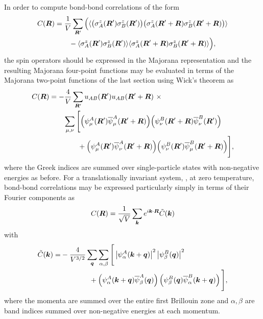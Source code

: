 In order to compute bond-bond correlations of the form
%
\begin{align}
	C(\bm{R}) 	&= \frac{1}{V} \sum_{\bm{R}'} \Big( \langle \big(\sigma^z_A(\bm{R}') \sigma^z_B(\bm{R}')\big) \big(\sigma^z_A(\bm{R}'+\bm{R}) \sigma^z_B(\bm{R}'+\bm{R})\big) \rangle\nonumber\\
			&\qquad- \langle \sigma^z_A(\bm{R}') \sigma^z_B(\bm{R}') \rangle \langle \sigma^z_A(\bm{R}'+\bm{R}) \sigma^z_B(\bm{R}'+\bm{R}) \rangle \Big),
\end{align}
%
the spin operators should be expressed in the Majorana representation and the resulting Majorana four-point functions may be evaluated in terms of the Majorana two-point functions of the last section using Wick's theorem as
%
\begin{align}
	C(\bm{R}) 	&= -\frac{4}{V} \sum_{\bm{R}'} u_{AB}(\bm{R}') u_{AB}(\bm{R}' + \bm{R})~\times \nonumber\\
			&\qquad\sum_{\mu,\nu} \Bigg[\Big(\psi_{\mu}^A(\bm{R}') \overline{\psi}_{\mu}^A(\bm{R}' + \bm{R})\Big) \Big(\psi_{\nu}^B(\bm{R}' + \bm{R}) \overline{\psi}_{\nu}^B(\bm{R}') \Big) \nonumber\\
			&\qquad\qquad+ \Big(\psi_{\mu}^A(\bm{R}') \overline{\psi}_{\nu}^A(\bm{R}' + \bm{R})\Big) \Big(\psi_{\nu}^B(\bm{R}') \overline{\psi}_{\mu}^B(\bm{R}' + \bm{R}) \Big)\Bigg],
\end{align}
%
where the Greek indices are summed over single-particle states with non-negative energies as before.
For a translationally invariant system, \eg, at zero temperature, bond-bond correlations may be expressed particularly simply in terms of their Fourier components as
%
\begin{equation}
	C(\bm{R}) = \frac{1}{\sqrt{V}} \sum_{\bm{k}} e^{\-i \bm{k}\cdot\bm{R}} \tilde{C}(\bm{k})
	\label{eq:chapter07_BondBondInverseFourier}
\end{equation}
%
with
%
\begin{align}
	\tilde{C}(\bm{k}) =	&-\frac{4}{V^{3/2}} \sum_{\bm{q}} \sum_{\alpha,\beta} \Bigg[ \left|\psi_{\alpha}^A(\bm{k} + \bm{q})\right|^2 \left|\psi_{\beta}^B(\bm{q})\right|^2 \nonumber\\
						&\qquad\qquad+ \left(\psi_{\alpha}^A(\bm{k} + \bm{q}) \overline{\psi}_{\beta}^A(\bm{q})\right) \left(\psi_{\beta}^B(\bm{q}) \overline{\psi}_{\alpha}^B(\bm{k} + \bm{q})\right) \Bigg],
	\label{eq:chapter07_BondBondZeroTFourier}
\end{align}
%
where the momenta are summed over the entire first Brillouin zone and $\alpha,\beta$ are band indices summed over non-negative energies at each momentum.

